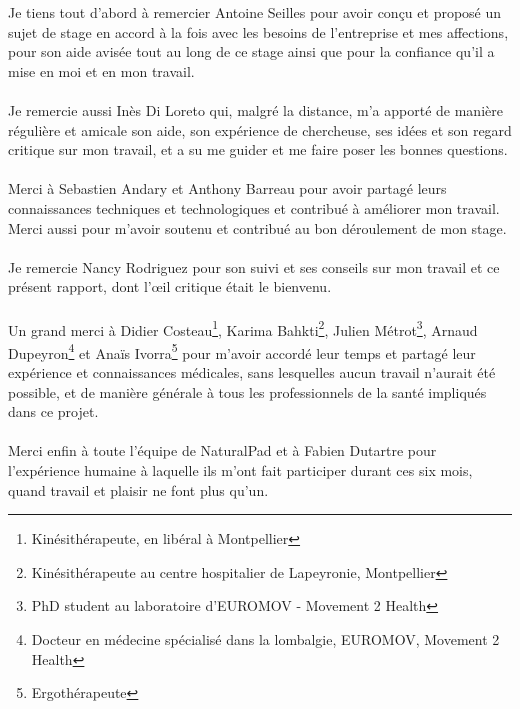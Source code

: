 Je tiens tout d'abord à remercier Antoine Seilles pour avoir conçu et proposé un sujet de stage en accord à la fois avec les besoins de l'entreprise et mes affections, pour son aide avisée tout au long de ce stage ainsi que pour la confiance qu'il a mise en moi et en mon travail.

\paragraph{}Je remercie aussi Inès Di Loreto qui, malgré la distance, m'a apporté de manière régulière et amicale son aide, son expérience de chercheuse, ses idées et son regard critique sur mon travail, et a su me guider et me faire poser les bonnes questions.

\paragraph{}Merci à Sebastien Andary et Anthony Barreau pour avoir partagé leurs connaissances techniques et technologiques et contribué à améliorer mon travail. Merci aussi pour m'avoir soutenu et contribué au bon déroulement de mon stage.

\paragraph{}Je remercie Nancy Rodriguez pour son suivi et ses conseils sur mon travail et ce présent rapport, dont l'œil critique était le bienvenu.

\paragraph{}Un grand merci à Didier Costeau\footnote{Kinésithérapeute, en libéral à Montpellier}, Karima Bahkti\footnote{Kinésithérapeute au centre hospitalier de Lapeyronie, Montpellier}, Julien Métrot\footnote{PhD student au laboratoire d'EUROMOV - Movement 2 Health}, Arnaud Dupeyron\footnote{Docteur en médecine spécialisé dans la lombalgie, EUROMOV, Movement 2 Health} et Anaïs Ivorra\footnote{Ergothérapeute} pour m'avoir accordé leur temps et partagé leur expérience et connaissances médicales, sans lesquelles aucun travail n'aurait été possible, et de manière générale à tous les professionnels de la santé impliqués dans ce projet.

\paragraph{}Merci enfin à toute l'équipe de NaturalPad et à Fabien Dutartre pour l'expérience humaine à laquelle ils m'ont fait participer durant ces six mois, quand travail et plaisir ne font plus qu'un.

